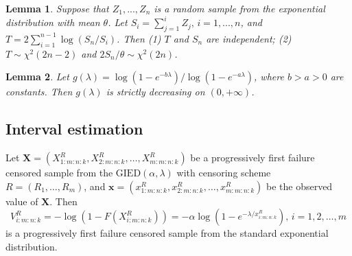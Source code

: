 \documentclass[12pt]{article}
\newtheorem {lemma}{Lemma}
\begin{document}
\begin{lemma} Suppose that $Z_1, ..., Z_n$ is a random sample from the exponential distribution with mean $\theta$. Let
$S_i=\sum_{j=1}^i Z_j,\,i=1,...,n$, and $T=2\sum_{i=1}^{n-1}\log(S_n/S_i)$. Then (1) $T$ and $S_n$ are independent; (2) $T \sim \chi^2(2n-2)$
and $2 S_n/\theta \sim \chi^2(2n)$.
\end{lemma}

\begin{lemma}
Let $g(\lambda)=\log(1-e^{-b\lambda})/\log(1-e^{-a\lambda})$, where $b>a>0$ are constants. Then $g(\lambda)$ is strictly
decreasing on $(0,+\infty)$.
\end{lemma}

\subsection{Interval estimation}

Let $\textbf{X}=(X_{1:m:n:k}^R,X_{2:m:n:k}^R, \ldots,X_{m:m:n:k}^R)$ be a progressively first failure censored sample from the $\mbox{GIED}(\alpha, \lambda)$ with censoring scheme  $R=(R_1,\ldots,R_m)$, and $\textbf{x}=(x_{1:m:n:k}^R,x_{2:m:n:k}^R, \ldots, x_{m:m:n:k}^R)$ be the observed value of $\textbf{X}$. Then %
\begin{equation*}
V_{i:m:n:k}^R=-\log(1-F(X_{i:m:n:k}^R))=-\alpha\log{(1-e^{{-\lambda}/{x_{i:m:n:k}^R}})},\,i=1,2,\dots,m
\end{equation*}
is a progressively first failure censored sample from the standard exponential distribution. %
\end{document}
